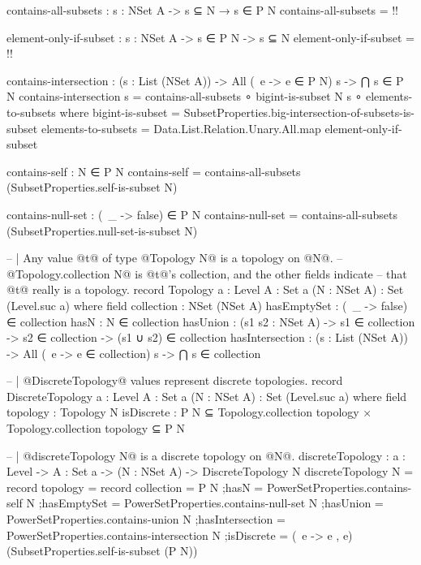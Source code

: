 \begin{code}
  contains-all-subsets : {s : NSet A} -> s ⊆ N → s ∈ P N
  contains-all-subsets = {!!}

  element-only-if-subset : {s : NSet A} -> s ∈ P N -> s ⊆ N
  element-only-if-subset = {!!}

  contains-intersection : (s : List (NSet A)) ->
                          All (\ e -> e ∈ P N) s ->
                          ⋂ s ∈ P N
  contains-intersection s = contains-all-subsets ∘ bigint-is-subset N s ∘ elements-to-subsets
    where
    bigint-is-subset = SubsetProperties.big-intersection-of-subsets-is-subset
    elements-to-subsets = Data.List.Relation.Unary.All.map element-only-if-subset

  contains-self : N ∈ P N
  contains-self = contains-all-subsets (SubsetProperties.self-is-subset N)

  contains-null-set : (\ _ -> false) ∈ P N
  contains-null-set = contains-all-subsets (SubsetProperties.null-set-is-subset N)

-- | Any value @t@ of type @Topology N@ is a topology on @N@.
-- @Topology.collection N@ is @t@'s collection, and the other fields indicate
-- that @t@ really is a topology.
record Topology {a : Level}
                {A : Set a}
                (N : NSet A) : Set (Level.suc a) where
  field
    collection : NSet (NSet A)
    hasEmptySet : (\ _ -> false) ∈ collection
    hasN : N ∈ collection
    hasUnion : (s1 s2 : NSet A) ->
               s1 ∈ collection ->
               s2 ∈ collection ->
               (s1 ∪ s2) ∈ collection
    hasIntersection : (s : List (NSet A)) ->
                      All (\ e -> e ∈ collection) s ->
                      ⋂ s ∈ collection

-- | @DiscreteTopology@ values represent discrete topologies.
record DiscreteTopology {a : Level}
                        {A : Set a}
                        (N : NSet A) : Set (Level.suc a) where
  field
    topology : Topology N
    isDiscrete : P N ⊆ Topology.collection topology ×
                 Topology.collection topology ⊆ P N

-- | @discreteTopology N@ is a discrete topology on @N@.
discreteTopology : {a : Level} -> {A : Set a} -> (N : NSet A) -> DiscreteTopology N
discreteTopology N = record
  {topology = record
     {collection = P N
     ;hasN = PowerSetProperties.contains-self N
     ;hasEmptySet = PowerSetProperties.contains-null-set N
     ;hasUnion = PowerSetProperties.contains-union N
     ;hasIntersection = PowerSetProperties.contains-intersection N
     }
  ;isDiscrete = (\ e -> e , e) (SubsetProperties.self-is-subset (P N))}


\end{code}
